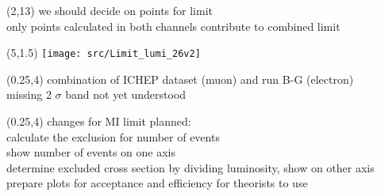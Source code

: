 \begin{frame}
        \begin{textblock}{14}(2,13) %
            we should decide on points for limit\\
            only points calculated in both channels contribute to combined limit
        \end{textblock}
        \begin{textblock}{11}(5,1.5) %
            \texttt{[image: src/Limit\_lumi\_26v2]}
        \end{textblock}
        \begin{textblock}{4}(0.25,4) %
            combination of ICHEP dataset (muon) and run B-G (electron)\\[1cm]
            missing 2 $\sigma$ band not yet understood
        \end{textblock}
\end{frame}
\begin{frame}
        \begin{textblock}{15}(0.25,4) %
            changes for MI limit planned:\\[1cm]
            calculate the exclusion for number of events\\
            show number of events on one axis\\
            determine excluded cross section by dividing luminosity, show on other axis\\
            prepare plots for acceptance and efficiency for theorists to use\\
        \end{textblock}
\end{frame}